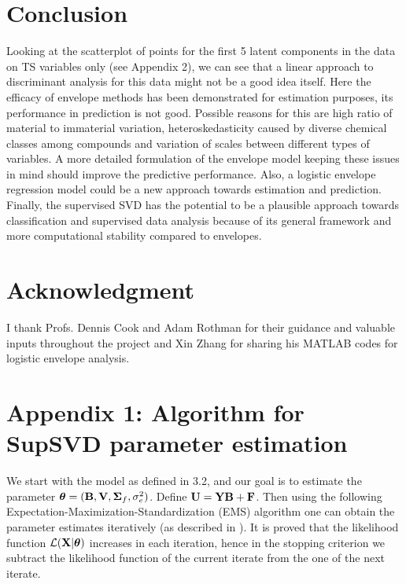 \documentclass[11pt]{llncs}
\begin{document}
\section{Conclusion}
Looking at the scatterplot of points for the first 5 latent components in the data on TS variables only (see Appendix 2), we can see that a linear approach to discriminant analysis for this data might not be a good idea itself. Here the efficacy of envelope methods has been demonstrated for estimation purposes, its performance in prediction is not good. Possible reasons for this are high ratio of material to immaterial variation, heteroskedasticity caused by diverse chemical classes among compounds and variation of scales between different types of variables. A more detailed formulation of the envelope model keeping these issues in mind should improve the predictive performance. Also, a logistic envelope regression model could be a new approach towards estimation and prediction. Finally, the supervised SVD has the potential to be a plausible approach towards classification and supervised data analysis because of its general framework and more computational stability compared to envelopes.

\section*{Acknowledgment}I thank Profs. Dennis Cook and Adam Rothman for their guidance and valuable inputs throughout the project and Xin Zhang for sharing his MATLAB codes for logistic envelope analysis.




\section*{Appendix 1: Algorithm for SupSVD parameter estimation}
We start with the model as defined in 3.2, and our goal is to estimate the parameter ${\boldsymbol{\theta}}=({\mathbf{B}},{\mathbf{V}},{\boldsymbol{\Sigma}}_f,\sigma_e^2)$. Define ${\mathbf{U}}={\mathbf{Y}}{\mathbf{B}}+{\mathbf{F}}$. Then using the following Expectation-Maximization-Standardization (EMS) algorithm one can obtain the parameter estimates iteratively (as described in \cite{supsvd}). It is proved that the likelihood function $\mathcal L({\mathbf{X}}|{\boldsymbol{\theta}})$ increases in each iteration, hence in the stopping criterion we subtract the likelihood function of the current iterate from the one of the next iterate.
\end{document}
